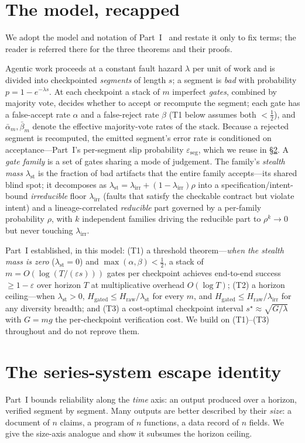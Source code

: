 \documentclass[11pt]{article}
\theoremstyle{definition}
\theoremstyle{remark}
\newcommand{\lst}{\lambda_{\mathrm{st}}}
\newcommand{\lirr}{\lambda_{\mathrm{irr}}}
\newcommand{\Hraw}{H_{\mathrm{raw}}}
\newcommand{\Hgated}{H_{\mathrm{gated}}}
\newcommand{\am}{\bar\alpha_m}
\newcommand{\bm}{\bar\beta_m}
\newcommand{\eseg}{\varepsilon_{\mathrm{seg}}}
\begin{document}
\section{The model, recapped}\label{sec:recap}
We adopt the model and notation of Part~I~\cite{matijasevic2026n1} and restate it only to fix terms;
the reader is referred there for the three theorems and their proofs.

Agentic work proceeds at a constant fault hazard $\lambda$ per unit of work and is divided into
checkpointed \emph{segments} of length $s$; a segment is \emph{bad} with probability
$p=1-e^{-\lambda s}$.
At each checkpoint a stack of $m$ imperfect \emph{gates}, combined by majority vote, decides whether
to accept or recompute the segment; each gate has a false-accept rate $\alpha$ and a false-reject rate
$\beta$ (T1 below assumes both $<\tfrac12$), and $\am,\bm$ denote the effective majority-vote rates of
the stack. Because a rejected segment is recomputed, the emitted segment's error rate is conditioned on
acceptance---Part~I's per-segment slip probability $\eseg$, which we reuse in \S\ref{sec:escape}.
A \emph{gate family} is a set of gates sharing a mode of judgement.
The family's \emph{stealth mass} $\lst$ is the fraction of bad artifacts that the entire family
accepts---its shared blind spot; it decomposes as $\lst=\lirr+(1-\lirr)\rho$ into a
specification/intent-bound \emph{irreducible} floor $\lirr$ (faults that satisfy the checkable
contract but violate intent) and a lineage-correlated \emph{reducible} part governed by a per-family
probability $\rho$, with $k$ independent families driving the reducible part to $\rho^k\to0$ but
never touching $\lirr$.

Part~I established, in this model: (T1) a threshold theorem---\emph{when the stealth mass is zero}
($\lst=0$) and $\max(\alpha,\beta)<\tfrac12$, a stack of $m=O(\log(T/(\varepsilon s)))$ gates per
checkpoint achieves end-to-end success $\ge1-\varepsilon$ over horizon $T$ at multiplicative overhead
$O(\log T)$; (T2) a horizon ceiling---when $\lst>0$, $\Hgated\le\Hraw/\lst$ for every $m$, and
$\Hgated\le\Hraw/\lirr$ for any diversity breadth;
and (T3) a cost-optimal checkpoint interval $s^\star\approx\sqrt{G/\lambda}$ with $G=mg$ the
per-checkpoint verification cost.
We build on (T1)--(T3) throughout and do not reprove them.

\section{The series-system escape identity}\label{sec:escape}
Part~I bounds reliability along the \emph{time} axis: an output produced over a horizon, verified
segment by segment.
Many outputs are better described by their \emph{size}: a document of $n$ claims, a program of $n$
functions, a data record of $n$ fields.
We give the size-axis analogue and show it subsumes the horizon ceiling.
\end{document}
